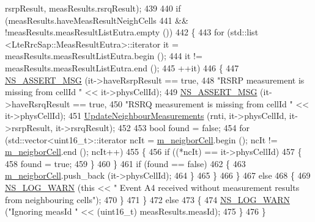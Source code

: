 \begin{DoxyCode}
      rsrpResult, measResults.rsrqResult);
439 
440       \textcolor{keywordflow}{if} (measResults.haveMeasResultNeighCells
441           && !measResults.measResultListEutra.empty ())
442         \{
443           \textcolor{keywordflow}{for} (std::list <LteRrcSap::MeasResultEutra>::iterator it = measResults.measResultListEutra.begin 
      ();
444                it != measResults.measResultListEutra.end ();
445                ++it)
446             \{
447               \hyperlink{assert_8h_aff5ece9066c74e681e74999856f08539}{NS\_ASSERT\_MSG} (it->haveRsrpResult == \textcolor{keyword}{true},
448                              \textcolor{stringliteral}{"RSRP measurement is missing from cellId "} << it->physCellId);
449               \hyperlink{assert_8h_aff5ece9066c74e681e74999856f08539}{NS\_ASSERT\_MSG} (it->haveRsrqResult == \textcolor{keyword}{true},
450                              \textcolor{stringliteral}{"RSRQ measurement is missing from cellId "} << it->physCellId);
451               \hyperlink{classns3_1_1LteFfrDistributedAlgorithm_a231df7e6a8731c11790643619a1d2858}{UpdateNeighbourMeasurements} (rnti, it->physCellId, it->rsrpResult,
       it->rsrqResult);
452 
453               \textcolor{keywordtype}{bool} found = \textcolor{keyword}{false};
454               \textcolor{keywordflow}{for} (std::vector<uint16\_t>::iterator ncIt = \hyperlink{classns3_1_1LteFfrDistributedAlgorithm_a824ee5482f34a9ce23948de09981103f}{m\_neigborCell}.begin (); ncIt != 
      \hyperlink{classns3_1_1LteFfrDistributedAlgorithm_a824ee5482f34a9ce23948de09981103f}{m\_neigborCell}.end (); ncIt++)
455                 \{
456                   \textcolor{keywordflow}{if} ((*ncIt) == it->physCellId)
457                     \{
458                       found = \textcolor{keyword}{true};
459                     \}
460                 \}
461               \textcolor{keywordflow}{if} (found == \textcolor{keyword}{false})
462                 \{
463                   \hyperlink{classns3_1_1LteFfrDistributedAlgorithm_a824ee5482f34a9ce23948de09981103f}{m\_neigborCell}.push\_back (it->physCellId);
464                 \}
465             \}
466         \}
467       \textcolor{keywordflow}{else}
468         \{
469           \hyperlink{group__logging_gade7208b4009cdf0e25783cd26766f559}{NS\_LOG\_WARN} (\textcolor{keyword}{this} << \textcolor{stringliteral}{" Event A4 received without measurement results from neighbouring
       cells"});
470         \}
471     \}
472   \textcolor{keywordflow}{else}
473     \{
474       \hyperlink{group__logging_gade7208b4009cdf0e25783cd26766f559}{NS\_LOG\_WARN} (\textcolor{stringliteral}{"Ignoring measId "} << (uint16\_t) measResults.measId);
475     \}
476 \}
\end{DoxyCode}


